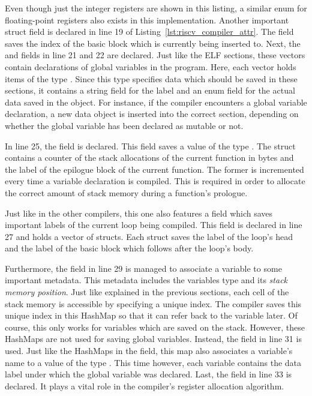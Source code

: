 
Even though just the integer registers are shown in this listing, a similar enum for floating-point registers also exists in this implementation.
Another important struct field is declared in line 19 of Listing~\ref{lst:riscv_compiler_attr}.
The  field saves the index of the basic block which is currently being inserted to.
Next, the  and  fields in line 21 and 22 are declared.
Just like the ELF sections, these vectors contain declarations of global variables in the program.
Here, each vector holds items of the type .
Since this type specifies data which should be saved in these sections, it contains a string field for the label and an enum field for the actual data saved in the object.
For instance, if the compiler encounters a global variable declaration, a new data object is inserted into the correct section, depending on whether the global variable has been declared as mutable or not.

In line 25, the  field is declared.
This field saves a value of the type .
The  struct contains a counter of the stack allocations of the current function in bytes and the label of the epilogue block of the current function.
The former is incremented every time a variable declaration is compiled.
This is required in order to allocate the correct amount of stack memory during a function's prologue.

Just like in the other compilers, this one also features a  field which saves important labels of the current loop being compiled.
This field is declared in line 27 and holds a vector of  structs.
Each  struct saves the label of the loop's head and the label of the basic block which follows after the loop's body.

Furthermore, the  field in line 29 is managed to associate a variable to some important metadata.
This metadata includes the variables type and its \emph{stack memory position}.
Just like explained in the previous sections, each cell of the stack memory is accessible by specifying a unique index.
The compiler saves this unique index in this HashMap so that it can refer back to the variable later.
Of course, this only works for variables which are saved on the stack.
However, these HashMaps are not used for saving global variables.
Instead, the  field in line 31 is used.
Just like the HashMaps in the  field, this map also associates a variable's name to a value of the type .
This time however, each variable contains the data label under which the global variable was declared.
Last, the  field in line 33 is declared.
It plays a vital role in the compiler's register allocation algorithm.

